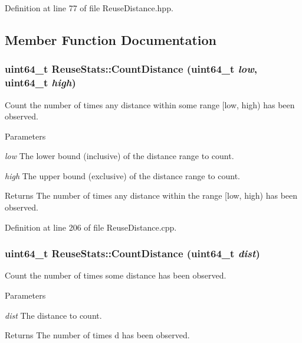 Definition at line 77 of file ReuseDistance.hpp.



\subsection{Member Function Documentation}
\hypertarget{class_reuse_stats_a07265484c0c3b4348ea090d28de37cbe}{
\subsubsection[{CountDistance}]{\setlength{\rightskip}{0pt plus 5cm}uint64\_\-t ReuseStats::CountDistance (uint64\_\-t {\em low}, \/  uint64\_\-t {\em high})}}
\label{class_reuse_stats_a07265484c0c3b4348ea090d28de37cbe}
Count the number of times any distance within some range \mbox{[}low, high) has been observed.


\begin{DoxyParams}{Parameters}
\item[{\em low}]The lower bound (inclusive) of the distance range to count. \item[{\em high}]The upper bound (exclusive) of the distance range to count.\end{DoxyParams}
\begin{DoxyReturn}{Returns}
The number of times any distance within the range \mbox{[}low, high) has been observed. 
\end{DoxyReturn}


Definition at line 206 of file ReuseDistance.cpp.

\hypertarget{class_reuse_stats_abdb92b77ec7191be80e77a34f894e11b}{
\subsubsection[{CountDistance}]{\setlength{\rightskip}{0pt plus 5cm}uint64\_\-t ReuseStats::CountDistance (uint64\_\-t {\em dist})}}
\label{class_reuse_stats_abdb92b77ec7191be80e77a34f894e11b}
Count the number of times some distance has been observed.


\begin{DoxyParams}{Parameters}
\item[{\em dist}]The distance to count.\end{DoxyParams}
\begin{DoxyReturn}{Returns}
The number of times d has been observed. 
\end{DoxyReturn}


